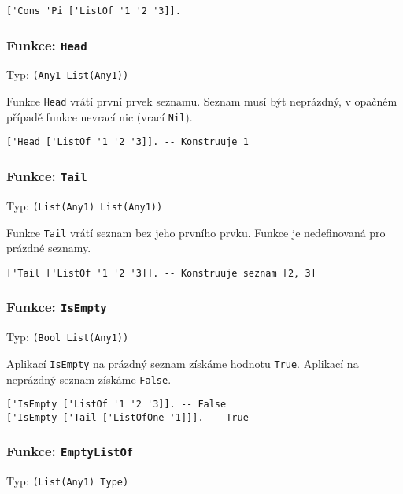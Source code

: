 \begin{lstlisting}[caption={Ukázka využití Cons}]
['Cons 'Pi ['ListOf '1 '2 '3]].
\end{lstlisting}

\subsubsection*{Funkce: \lstinline|Head|}
Typ: \lstinline{(Any1 List(Any1))}

Funkce \lstinline{Head} vrátí první prvek seznamu. Seznam musí být neprázdný, v opačném případě
funkce nevrací nic (vrací \lstinline{Nil}).

\begin{lstlisting}[caption={Ukázka využití Head}]
['Head ['ListOf '1 '2 '3]]. -- Konstruuje 1
\end{lstlisting}

\subsubsection*{Funkce: \lstinline|Tail|}
Typ: \lstinline{(List(Any1) List(Any1))}

Funkce \lstinline{Tail} vrátí seznam bez jeho prvního prvku. Funkce je nedefinovaná pro prázdné
seznamy.

\begin{lstlisting}[caption={Ukázka využití Head}]
['Tail ['ListOf '1 '2 '3]]. -- Konstruuje seznam [2, 3]
\end{lstlisting}

\subsubsection*{Funkce: \lstinline|IsEmpty|}
Typ: \lstinline{(Bool List(Any1))}

Aplikací \lstinline{IsEmpty} na prázdný seznam získáme hodnotu \lstinline{True}. Aplikací
na neprázdný seznam získáme \lstinline{False}.

\begin{lstlisting}[caption={Ukázka využití IsEmpty}]
['IsEmpty ['ListOf '1 '2 '3]]. -- False
['IsEmpty ['Tail ['ListOfOne '1]]]. -- True
\end{lstlisting}

\subsubsection*{Funkce: \lstinline|EmptyListOf|}
Typ: \lstinline{(List(Any1) Type)}


